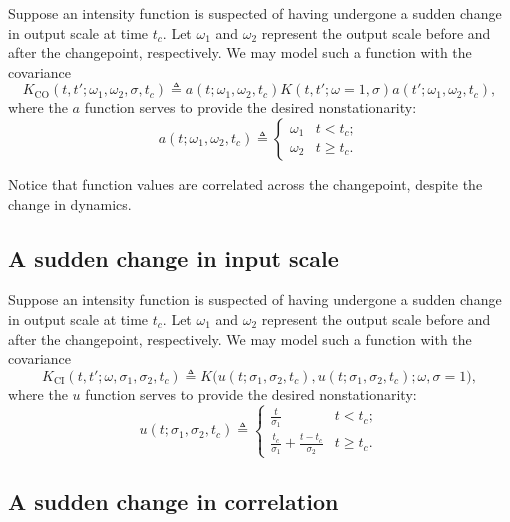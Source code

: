 \documentclass{article}
\newcommand{\deq}{\triangleq}
\begin{document}
Suppose an intensity function is suspected of having undergone a
sudden change in output scale at time $t_c$.  Let $\omega_1$ and
$\omega_2$ represent the output scale before and after the changepoint,
respectively.  We may model such a function with the covariance
\begin{equation*}
  K_{\text{CO}}(t, t'; \omega_1, \omega_2, \sigma, t_c)
  \deq 
  a(t; \omega_1, \omega_2, t_c)
  K(t, t'; \omega = 1, \sigma)
  a(t'; \omega_1, \omega_2, t_c),
\end{equation*}
where the $a$ function serves to provide the desired nonstationarity:
\begin{equation}
  \label{outchange}
  a(t; \omega_1, \omega_2, t_c) 
  \deq
  \begin{cases}
    \omega_1 & t < t_c; \\
    \omega_2 & t \geq t_c.
  \end{cases}
\end{equation}

Notice that function values are correlated across the changepoint,
despite the change in dynamics.

\subsection{A sudden change in input scale}

Suppose an intensity function is suspected of having undergone a
sudden change in output scale at time $t_c$.  Let $\omega_1$ and
$\omega_2$ represent the output scale before and after the changepoint,
respectively.  We may model such a function with the covariance
\begin{equation*}
  K_{\text{CI}}(t, t'; \omega, \sigma_1, \sigma_2, t_c)
  \deq 
  K
  \bigl(
    u(t; \sigma_1, \sigma_2, t_c), 
    u(t; \sigma_1, \sigma_2, t_c); 
    \omega, \sigma = 1 
  \bigr),
\end{equation*}
where the $u$ function serves to provide the desired nonstationarity:
\begin{equation}
  \label{inchange}
  u(t; \sigma_1, \sigma_2, t_c) 
  \deq
  \begin{cases}
    \frac{t}{\sigma_1} 
    & t < t_c; \\
    \frac{t_c}{\sigma_1} + \frac{t - t_c}{\sigma_2} 
    & t \geq t_c.
  \end{cases}
\end{equation}

\subsection{A sudden change in correlation}
\end{document}
